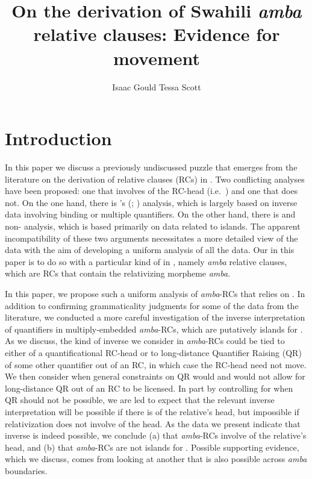 \documentclass[output=paper
,newtxmath
,modfonts
,nonflat]{langsci/langscibook}
\title{On the derivation of Swahili \textit{amba} relative clauses: Evidence for movement}
\author{Isaac Gould \affiliation{Ewha Womans University}\lastand Tessa Scott \affiliation{University of California, Berkeley}}
\begin{document}
\maketitle

\section{Introduction}\label{sec:gould:1}

In this paper we discuss a previously undiscussed puzzle that emerges from the literature on the derivation of relative clauses (RCs) in . Two conflicting analyses have been proposed: one that involves  of the RC-head (i.e.\ ) and one that does not. On the one hand, there is \citeauthor{Ngonyani2001}'s (\citeyear{Ngonyani2001}; \citeyear{Ngonyani2006})  analysis, which is largely based on inverse  data involving  binding or multiple quantifiers. On the other hand, there is  and  non- analysis, which is based primarily on data related to  islands. The apparent incompatibility of these two arguments necessitates a more detailed view of the data with the aim of developing a uniform analysis of all the data. Our  in this paper is to do so with a particular kind of  in , namely \textit{amba} relative clauses, which are RCs that contain the relativizing morpheme \textit{amba}. 

In this paper, we propose such a uniform analysis of \textit{amba}{}-RCs that relies on . In addition to confirming grammaticality judgments for some of the data from the literature, we conducted a more careful investigation of the inverse  interpretation of quantifiers in multiply-embedded \textit{amba}{}-RCs, which are putatively islands for . As we discuss, the kind of inverse  we consider in \textit{amba}{}-RCs could be tied to either  of a quantificational RC-head or to long-distance Quantifier Raising (QR) of some other quantifier out of an RC, in which case the RC-head need not move. We then consider when general constraints on QR would and would not allow for long-distance QR out of an RC to be licensed. In part by controlling for when QR should not be possible, we are led to expect that the relevant inverse  interpretation will be possible if there is  of the relative’s head, but impossible if relativization does not involve  of the head. As the data we present indicate that inverse  is indeed possible, we conclude (a) that \textit{amba}{}-RCs involve  of the relative’s head, and (b) that \textit{amba}{}-RCs are not islands for . Possible supporting evidence, which we discuss, comes from looking at another  that is also possible across \textit{amba}  boundaries.
\end{document}
